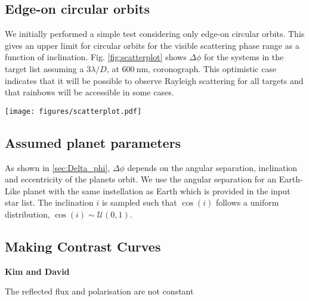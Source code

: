 \documentclass[
    usenatbib,
]{mnras}
\begin{document}
\subsection{Edge-on circular orbits}
\label{sec:edge-on}
We initially performed a simple test considering only edge-on circular orbits. This gives an upper limit for circular orbits for the visible scattering phase range as a function of inclination. Fig. \ref{fig:scatterplot} shows $\Delta \phi$ for the systems in the target list assuming a $3 \lambda / D$, at $\SI{600}{\nano\meter}$, coronograph. This optimistic case indicates that it will be possible to observe Rayleigh scattering for all targets and that rainbows will be accessible in some cases.

\begin{figure*}
    \centering
    \texttt{[image: figures/scatterplot.pdf]}
    \caption{
        Scatter plot at 3 $\lambda/D$ for the target sample showing stellar effective temperature and stellar distance. 
        The size of the points represents the angular separation of the star and planet in milliarcseconds as presented in the target list. The colour of the points shows the atmospheric phenomenon that can be detected with darker colors including all lighter (yellow) color phenomenon. Thus dark blue points are systems which have the most key features, as systems in which the angles required to see the rainbow are probed will also have the angles required to see the Rayleigh scattering probed.
    }
    \label{fig:scatterplot}
\end{figure*}

\subsection{Assumed planet parameters}

As shown in \cref{sec:Delta_phi}, $\Delta \phi$ depends on the angular separation, inclination and eccentricity of the planets orbit. 
We use the angular separation for an Earth-Like planet with the same instellation as Earth which is provided in the input star list. 
The inclination $i$ is sampled such that $\cos(i)$ follows a uniform distribution, $\cos(i) \sim \mathcal{U}(0, 1)$.

\subsection{Making Contrast Curves}
\textbf{Kim and David}
%

The reflected flux and polarisation are not constant 
\end{document}
